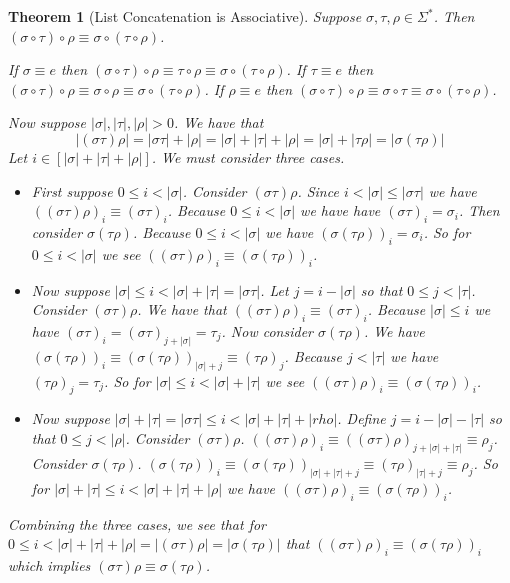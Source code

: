 \documentclass[12pt]{article}
\theoremstyle{break}
\theoremstyle{break}
\newtheorem{theorem}{Theorem}[section]
\theoremstyle{break}
\theoremstyle{break}
\theoremstyle{break}
\newtheorem{informal definition}[definition]{Informal Definition}
\theoremstyle{break}
\newtheorem{informal theorem}[theorem]{Informal Theorem}
\begin{document}
	\begin{theorem}[List Concatenation is Associative]
		Suppose $\sigma, \tau, \rho \in \Sigma^*$.
		Then $(\sigma \circ \tau) \circ \rho \equiv \sigma \circ (\tau \circ \rho)$.
		
		If $\sigma \equiv e$ then $(\sigma \circ \tau) \circ \rho \equiv \tau \circ \rho \equiv \sigma \circ (\tau \circ \rho)$.
		If $\tau \equiv e$ then $(\sigma \circ \tau) \circ \rho \equiv \sigma \circ \rho \equiv \sigma \circ (\tau \circ \rho)$.
		If $\rho \equiv e$ then $(\sigma \circ \tau) \circ \rho \equiv \sigma \circ \tau \equiv \sigma \circ (\tau \circ \rho)$.
		
		Now suppose $|\sigma|, |\tau|, |\rho|>0$.
		We have that
		$$
		|(\sigma\tau)\rho| = |\sigma\tau| + |\rho| = |\sigma| + |\tau| + |\rho| = |\sigma| + |\tau \rho| = |\sigma(\tau\rho)|
		$$
		Let $i \in [|\sigma| + |\tau| + |\rho|]$.
		We must consider three cases.
		
		\begin{itemize}
			\item{First suppose $0 \le i < |\sigma|$.
				Consider $(\sigma \tau) \rho$.
				Since $i < |\sigma| \le |\sigma \tau|$ we have $((\sigma \tau)\rho)_i \equiv (\sigma \tau)_i$.
				Because $0 \le i < |\sigma|$ we have have $(\sigma \tau)_i = \sigma_i$.
				Then consider $\sigma (\tau\rho)$.
				Because $0 \le i < |\sigma|$ we have $(\sigma(\tau\rho))_i = \sigma_i$.
				So for $0 \le i < |\sigma|$ we see $((\sigma \tau) \rho)_i \equiv (\sigma (\tau \rho))_i$.}
			\item{Now suppose $|\sigma| \le i < |\sigma| + |\tau| = |\sigma \tau|$.
				Let $j = i - |\sigma|$ so that $0 \le j < |\tau|$.
				Consider $(\sigma \tau) \rho$.
				We have that $((\sigma \tau) \rho)_i \equiv (\sigma \tau)_i$.
				Because $|\sigma| \le i$ we have $(\sigma \tau)_i = (\sigma \tau)_{j + |\sigma|} = \tau_j$.
				Now consider $\sigma (\tau \rho)$.
				We have $(\sigma (\tau \rho))_i \equiv (\sigma (\tau \rho))_{|\sigma| + j} \equiv (\tau \rho)_j$.
				Because $j < |\tau|$ we have $(\tau \rho)_j = \tau_j$.
				So for $|\sigma| \le i < |\sigma| + |\tau|$ we see $((\sigma \tau) \rho)_i \equiv (\sigma (\tau \rho))_i$.}
			\item{Now suppose $|\sigma| + |\tau| = |\sigma \tau| \le i < |\sigma| + |\tau| + |rho|$.
				Define $j = i - |\sigma| - |\tau|$ so that $ 0 \le j < |\rho|$.
				Consider $(\sigma \tau) \rho$.
				$((\sigma \tau) \rho)_i \equiv ((\sigma \tau) \rho)_{j + |\sigma| + |\tau|} \equiv \rho_j$.
				Consider $\sigma (\tau \rho)$.
				$(\sigma (\tau \rho))_i \equiv (\sigma (\tau \rho))_{|\sigma| + |\tau| + j} \equiv (\tau \rho)_{|\tau| + j} \equiv \rho_j$.
				So for $|\sigma| + |\tau| \le i < |\sigma| + |\tau| + |\rho|$ we have $((\sigma \tau)\rho)_i \equiv (\sigma (\tau \rho))_i$.}
		\end{itemize}
		
		Combining the three cases, we see that for $0 \le i < |\sigma| + |\tau| + |\rho| = |(\sigma \tau) \rho| = |\sigma (\tau \rho)|$ that $((\sigma \tau) \rho)_i \equiv (\sigma (\tau \rho))_i$ which implies $(\sigma \tau) \rho \equiv \sigma (\tau \rho)$.
	\end{theorem}
	
\end{document}
